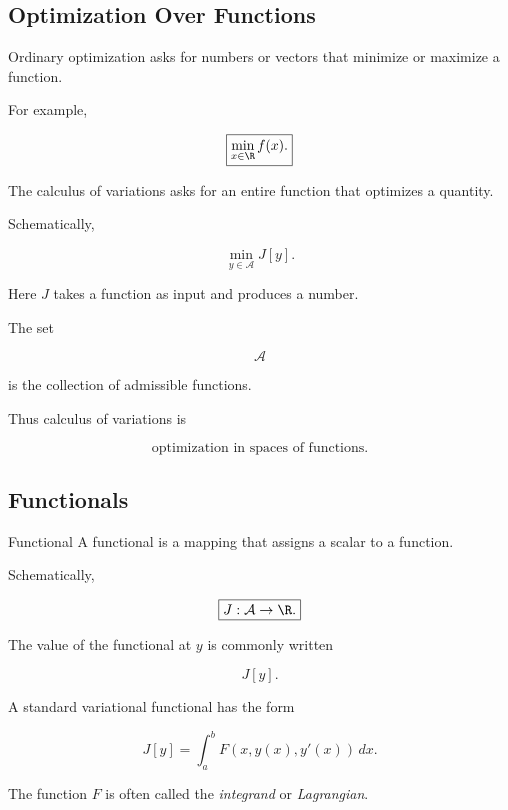 \subsection{Optimization Over Functions}
\label{subsec:variational-optimization-functions}

Ordinary optimization asks for numbers or vectors that minimize or
maximize a function.

For example,

\[
\boxed{
\min_{x\in\R}f(x).
}
\]

The calculus of variations asks for an entire function that optimizes a
quantity.

Schematically,

\[
\boxed{
\min_{y\in\mathcal{A}}J[y].
}
\]

Here \(J\) takes a function as input and produces a number.

The set

\[
\mathcal{A}
\]

is the collection of admissible functions.

Thus calculus of variations is

\[
\boxed{
\text{optimization in spaces of functions}.
}
\]

\subsection{Functionals}
\label{subsec:functionals}

\begin{definitionbox}{Functional}
A functional is a mapping that assigns a scalar to a function.

Schematically,

\[
\boxed{
J:\mathcal{A}\to\R.
}
\]

The value of the functional at \(y\) is commonly written

\[
\boxed{
J[y].
}
\]
\end{definitionbox}

A standard variational functional has the form

\[
\boxed{
J[y]
=
\int_a^b
F(x,y(x),y'(x))\,dx.
}
\]

The function \(F\) is often called the \emph{integrand} or
\emph{Lagrangian}.

